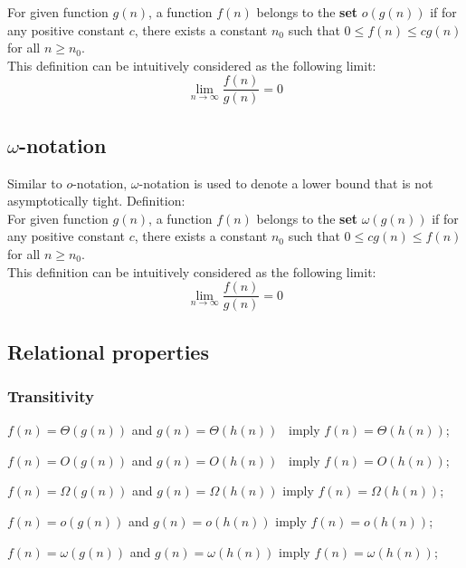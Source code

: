 \documentclass{article}
\begin{document}
For given function $g(n)$, a function $f(n)$ belongs to the \textbf{set} $o(g(n))$ if for any positive constant $c$, there exists a constant $n_0$ such that $0 \leq f(n) \leq cg(n)$ for all $n \geq n_0$.\\
This definition can be intuitively considered as the following limit: \[\lim_{n\to\infty}{\frac{f(n)}{g(n)}} = 0\] %

\subsection*{$\omega$-notation}

Similar to $o$-notation, $\omega$-notation is used to denote a lower bound that is not asymptotically tight. Definition:\\

For given function $g(n)$, a function $f(n)$ belongs to the \textbf{set} $\omega(g(n))$ if for any positive constant $c$, there exists a constant $n_0$ such that $0 \leq cg(n) \leq f(n)$ for all $n \geq n_0$.\\
This definition can be intuitively considered as the following limit: \[\lim_{n\to\infty}{\frac{f(n)}{g(n)}} = 0\]

\subsection*{Relational properties}
\subsubsection*{Transitivity}

\hspace{3cm} $f(n) = \Theta(g(n))$ and $g(n) =\Theta(h(n))$ \, imply $f(n) = \Theta(h(n))$;

\hspace{3cm} $f(n) = O(g(n))$ and $g(n) =O(h(n))$  \, imply $f(n) = O(h(n))$;

\hspace{3cm} $f(n) = \Omega(g(n))$ and $g(n) =\Omega(h(n))$  \hspace{1.2mm} imply $f(n) = \Omega(h(n))$;

\hspace{3cm} $f(n) = o(g(n))$ and $g(n) =o(h(n))$  \hspace{3mm} imply $f(n) = o(h(n))$;

\hspace{3cm} $f(n) = \omega(g(n))$ and $g(n) =\omega(h(n))$ \hspace{1.8mm} imply $f(n) = \omega(h(n))$;
\end{document}
